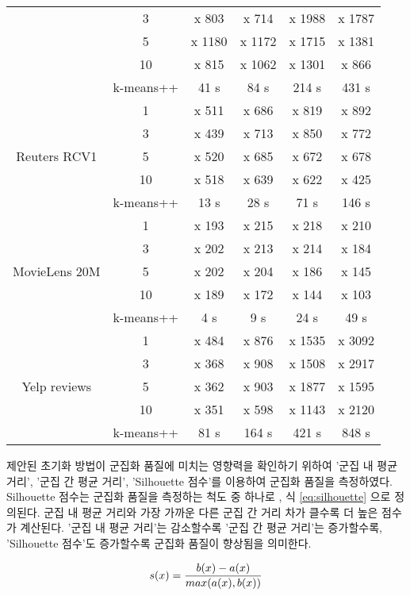\documentclass[oneside, ko,phd]{snuthesis_utf8_kor}
\begin{document}
\begin{table}[H]
\begin{tabular}{|c|c|c|c|c|c|}
 & 3 & x 803 & x 714 & x 1988 & x 1787 \\ \cline{2-6} 
 & 5 & x 1180 & x 1172 & x 1715 & x 1381 \\ \cline{2-6} 
 & 10 & x 815 & x 1062 & x 1301 & x 866 \\ \cline{2-6} 
 & k-means++ & 41 s & 84 s & 214 s & 431 s \\ \hline
\multirow{5}{*}{Reuters RCV1} & 1 & x 511 & x 686 & x 819 & x 892 \\ \cline{2-6} 
 & 3 & x 439 & x 713 & x 850 & x 772 \\ \cline{2-6} 
 & 5 & x 520 & x 685 & x 672 & x 678 \\ \cline{2-6} 
 & 10 & x 518 & x 639 & x 622 & x 425 \\ \cline{2-6} 
 & k-means++ & 13 s & 28 s & 71 s & 146 s \\ \hline
\multirow{5}{*}{MovieLens 20M} & 1 & x 193 & x 215 & x 218 & x 210 \\ \cline{2-6} 
 & 3 & x 202 & x 213 & x 214 & x 184 \\ \cline{2-6} 
 & 5 & x 202 & x 204 & x 186 & x 145 \\ \cline{2-6} 
 & 10 & x 189 & x 172 & x 144 & x 103 \\ \cline{2-6} 
 & k-means++ & 4 s & 9 s & 24 s & 49 s \\ \hline
\multirow{5}{*}{Yelp reviews} & 1 & x 484 & x 876 & x 1535 & x 3092 \\ \cline{2-6} 
 & 3 & x 368 & x 908 & x 1508 & x 2917 \\ \cline{2-6} 
 & 5 & x 362 & x 903 & x 1877 & x 1595 \\ \cline{2-6} 
 & 10 & x 351 & x 598 & x 1143 & x 2120 \\ \cline{2-6} 
 & k-means++ & 81 s & 164 s & 421 s & 848 s \\ \hline
\end{tabular}
\end{table}

제안된 초기화 방법이 군집화 품질에 미치는 영향력을 확인하기 위하여 '군집 내 평균 거리', '군집 간 평균 거리', 'Silhouette 점수'를 이용하여 군집화 품질을 측정하였다.
Silhouette 점수는 군집화 품질을 측정하는 척도 중 하나로 \cite{rousseeuw1987silhouettes, lewis2012human}, 식 \ref{eq:silhouette} 으로 정의된다.
군집 내 평균 거리와 가장 가까운 다른 군집 간 거리 차가 클수록 더 높은 점수가 계산된다.
'군집 내 평균 거리'는 감소할수록 '군집 간 평균 거리'는 증가할수록, 'Silhouette 점수'도 증가할수록 군집화 품질이 향상됨을 의미한다.

\begin{equation}
\label{eq:silhouette}
\centering
s(x) = \frac{b(x) - a(x)}{max(a(x), b(x))}
\end{equation}
\end{document}
